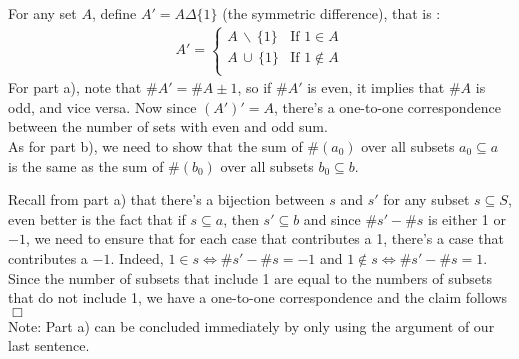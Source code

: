 



\begin{solution} 
    For any set $A$, define $A' = A \Delta \{1\}$ (the symmetric difference), that is :
    \begin{align*}
        A' = 
        \begin{cases}
            A \, \backslash \, \{ 1 \} & \text{If } 1 \in A \\
            A \, \cup \, \{ 1 \} & \text{If } 1 \notin A \\
        \end{cases}
    \end{align*}
    For part a), note that $\# A' = \#A \pm 1$, so if $\# A'$ is even, it implies that $\#A$ is odd, and vice versa. Now since $(A')' = A$, there's a one-to-one correspondence between the number of sets with even and odd sum. \\[3mm]
    As for part b), we need to show that the sum of $\#(a_0)$ over all subsets $a_0 \subseteq a$ is the same as the sum of $\#(b_0)$ over all subsets $b_0 \subseteq b$.
    
    Recall from part a) that there's a bijection between $s$ and $s'$ for any subset $s \subseteq S$, even better is the fact that if $s \subseteq a$, then $s' \subseteq b$ and since $\#s' - \#s$ is either 1 or \(-1\), we need to ensure that for each case that contributes a 1, there's a case that contributes a \(-1\). Indeed, $1 \in s \iff \#s' - \#s = -1$ and $1 \notin s \iff \#s' - \#s = 1$. Since the number of subsets that include 1 are equal to the numbers of subsets that do not include 1, we have a one-to-one correspondence and the claim follows $\Box$  \\[2mm]
    Note: Part a) can be concluded immediately by only using the argument of our last sentence. 
\end{solution}

